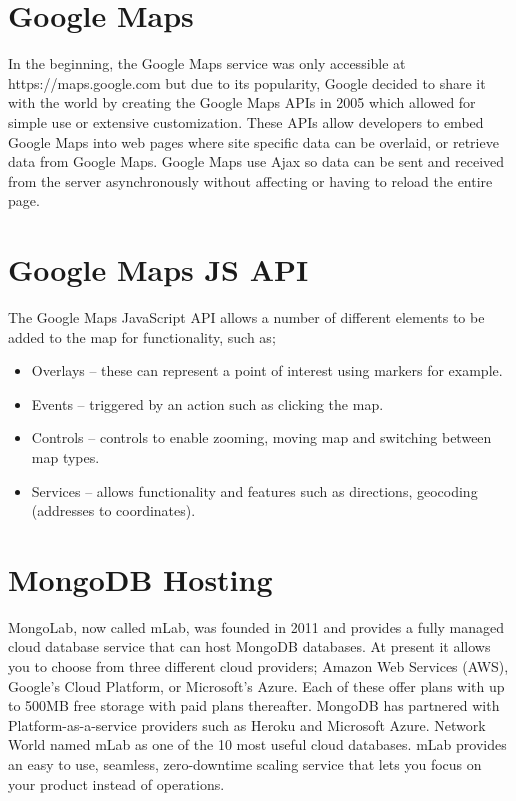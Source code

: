 \begin{itemize}
\bigbreak
\section{Google Maps}
In the beginning, the Google Maps service was only accessible at https://maps.google.com but due to its popularity, Google decided to share it with the world by creating the Google Maps APIs in 2005 which allowed for simple use or extensive customization. These APIs allow developers to embed Google Maps into web pages where site specific data can be overlaid, or retrieve data from Google Maps. Google Maps use Ajax so data can be sent and received from the server asynchronously without affecting or having to reload the entire page.  


\section{Google Maps JS API}
The Google Maps JavaScript API allows a number of different elements to be added to the map for functionality, such as;

\begin{itemize}
	
	\item Overlays – these can represent a point of interest using markers for example.  
	\item Events – triggered by an action such as clicking the map. 
	\item Controls – controls to enable zooming, moving map and switching between map types.
	\item Services – allows functionality and features such as directions, geocoding (addresses to coordinates). 
	
\end{itemize}	
\section{MongoDB Hosting}
MongoLab, now called mLab, was founded in 2011 and provides a fully managed cloud database service that can host MongoDB databases. At present it allows you to choose from three different cloud providers; Amazon Web Services (AWS), Google's Cloud Platform, or Microsoft's Azure. Each of these offer plans with up to 500MB free storage with paid plans thereafter. MongoDB has partnered with Platform-as-a-service providers such as Heroku and Microsoft Azure. Network World named mLab as one of the 10 most useful cloud databases. mLab provides an easy to use, seamless, zero-downtime scaling service that lets you focus on your product instead of operations.










\end{itemize}
